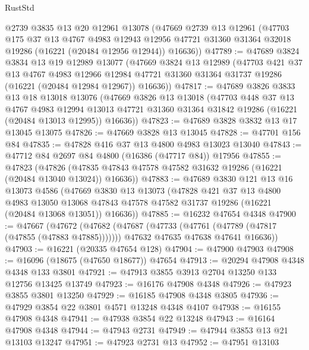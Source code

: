 \begin{lexlean}{RustStd}
\begin{coremodule}
    @2739
    @3835
    @13
    @20
    @12961
    @13078
    (@47669
      @2739
      @13
      @12961
      (@47703
        @175
        @37
        @13
        @4767
        @4983
        @12943
        @12956
        @47721
        @31360
        @31364
        @32018
        @19286
        (@16221 (@20484 @12956 @12944))
        @16636))
@47789 := @47689
    @3824
    @3834
    @13
    @19
    @12989
    @13077
    (@47669
      @3824
      @13
      @12989
      (@47703
        @421
        @37
        @13
        @4767
        @4983
        @12966
        @12984
        @47721
        @31360
        @31364
        @31737
        @19286
        (@16221 (@20484 @12984 @12967))
        @16636))
@47817 := @47689
    @3826
    @3833
    @13
    @18
    @13018
    @13076
    (@47669
      @3826
      @13
      @13018
      (@47703
        @448
        @37
        @13
        @4767
        @4983
        @12994
        @13013
        @47721
        @31360
        @31364
        @31842
        @19286
        (@16221 (@20484 @13013 @12995))
        @16636))
@47823 := @47689 @3828 @3832 @13 @17 @13045 @13075
@47826 := @47669 @3828 @13 @13045
@47828 := @47701 @156 @84
@47835 := @47828 @416 @37 @13 @4800 @4983 @13023 @13040
@47843 := @47712 @84 @2697 @84 @4800 (@16386 (@47717 @84)) @17956
@47855 := @47823
    (@47826 (@47835 @47843 @47578 @47582 @31632 @19286 (@16221 (@20484 @13040 @13024)) @16636))
@47883 := @47689
    @3830
    @121
    @13
    @16
    @13073
    @4586
    (@47669
      @3830
      @13
      @13073
      (@47828
        @421
        @37
        @13
        @4800
        @4983
        @13050
        @13068
        @47843
        @47578
        @47582
        @31737
        @19286
        (@16221 (@20484 @13068 @13051))
        @16636))
@47885 := @16232 @47654 @4348
@47900 := @47667
    (@47672
      (@47682
        (@47687 (@47733 (@47761 (@47789 (@47817 (@47855 (@47883 @47885)))))))
        @47632
        @47635
        @47638
        @47641
        @16636))
@47903 := @16221 (@20335 @47654 @128)
@47904 := @47900 @47903
@47908 := @16096 (@18675 (@47650 @18677)) @47654
@47913 := @20294 @47908 @4348 @4348 @133 @3801
@47921 := @47913 @3855 @3913 @2704 @13250 @133 @12756 @13425 @13749
@47923 := @16176 @47908 @4348
@47926 := @47923 @3855 @3801 @13250
@47929 := @16185 @47908 @4348 @3805
@47936 := @47929 @3854 @22 @3801 @4571 @13248 @4348 @4107
@47938 := @16155 @47908 @4348
@47941 := @47938 @3854 @22 @13248
@47943 := @16164 @47908 @4348
@47944 := @47943 @2731
@47949 := @47944 @3853 @13 @21 @13103 @13247
@47951 := @47923 @2731 @13
@47952 := @47951 @13103

\end{coremodule}
\end{lexlean}
